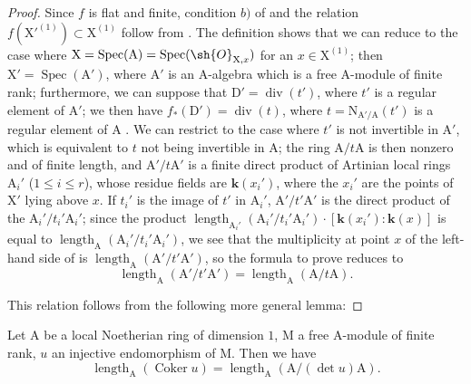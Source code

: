 \begin{proof}
Since $f$ is flat and finite, condition $b)$ of  and the relation $f(\mathrm{X}'^{(1)})\subset\mathrm{X}^{(1)}$ follow from .
The definition  shows that we can reduce to the case where $\mathrm{X}=\operatorname{Spec}(\mathrm{A})=\operatorname{Spec}(\sh{O}_{\mathrm{X},x})$ for an $x\in\mathrm{X}^{(1)}$; then $\mathrm{X}'=\operatorname{Spec}(\mathrm{A}')$, where $\mathrm{A}'$ is an $\mathrm{A}$-algebra which is a
free $\mathrm{A}$-module of finite rank; furthermore, we can suppose that $\mathrm{D}'=\operatorname{div}(t')$, where $t'$ is a regular element of $\mathrm{A}'$; we then have $f_*(\mathrm{D}')=\operatorname{div}(t)$, where $t=\mathrm{N}_{\mathrm{A}'/\mathrm{A}}(t')$ is a regular element of $\mathrm{A}$ .
We can restrict to the case where $t'$ is not invertible in $\mathrm{A}'$, which is equivalent to $t$ not being invertible in $\mathrm{A}$; the ring $\mathrm{A}/t\mathrm{A}$ is then nonzero and of finite length, and $\mathrm{A}'/t\mathrm{A}'$ is a finite direct product of Artinian local rings $\mathrm{A}_i'$ ($1\leq i\leq r$), whose residue fields are $\boldsymbol{k}(x_i')$, where the $x_i'$ are the points of $\mathrm{X}'$ lying above $x$.
If $t_i'$ is the image of $t'$ in $\mathrm{A}_i'$, $\mathrm{A}'/t'\mathrm{A}'$ is the direct product of the $\mathrm{A}_i'/t_i'\mathrm{A}_i'$; since the product $\operatorname{length}_{\mathrm{A}_i'}(\mathrm{A}_i'/t_i'\mathrm{A}_i')\cdot[\boldsymbol{k}(x_i'):\boldsymbol{k}(x)]$ is equal to $\operatorname{length}_{\mathrm{A}}(\mathrm{A}_i'/t_i'\mathrm{A}_i')$, we see that the multiplicity at point $x$ of the left-hand side of  is $\operatorname{length}_{\mathrm{A}}(\mathrm{A}'/t'\mathrm{A}')$, so the formula to prove reduces to
\[
\label{IV.21.10.17.2}
  \operatorname{length}_{\mathrm{A}}(\mathrm{A}'/t'\mathrm{A}')=\operatorname{length}_{\mathrm{A}}(\mathrm{A}/t\mathrm{A}).
  \tag{21.10.17.2}
\]

This relation follows from the following more general lemma:
\end{proof}

\begin{lemma}[21.10.17.3]
\label{IV.21.10.17.3}
Let $\mathrm{A}$ be a local Noetherian ring of dimension $1$, $\mathrm{M}$ a free A-module of finite rank, $u$ an injective endomorphism of $\mathrm{M}$.
Then we have
\[
\label{IV.21.10.17.4}
  \operatorname{length}_{\mathrm{A}}(\operatorname{Coker} u)=\operatorname{length}_{\mathrm{A}}(\mathrm{A}/(\det u)\mathrm{A}).
  \tag{21.10.17.4}
\]
\end{lemma}


